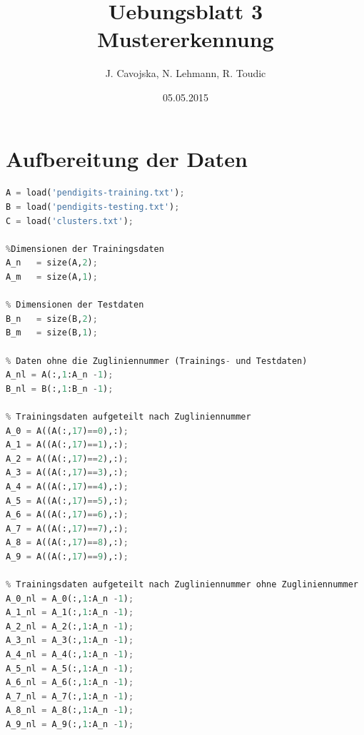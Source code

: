 \documentclass[12pt]{article}
\title{Uebungsblatt 3\\ \glqq Mustererkennung\grqq}
\author{J. Cavojska, N. Lehmann, R. Toudic}
\date{05.05.2015}
\begin{document}
\maketitle

\section{Aufbereitung der Daten}
\begin{lstlisting}[language=Python]
% Trainingsdaten, Testdaten und Clusterdaten laden
A = load('pendigits-training.txt');
B = load('pendigits-testing.txt');
C = load('clusters.txt');

%Dimensionen der Trainingsdaten
A_n   = size(A,2);
A_m   = size(A,1);

% Dimensionen der Testdaten
B_n   = size(B,2);
B_m   = size(B,1);

% Daten ohne die Zugliniennummer (Trainings- und Testdaten)
A_nl = A(:,1:A_n -1);
B_nl = B(:,1:B_n -1);

% Trainingsdaten aufgeteilt nach Zugliniennummer
A_0 = A((A(:,17)==0),:);
A_1 = A((A(:,17)==1),:);
A_2 = A((A(:,17)==2),:);
A_3 = A((A(:,17)==3),:); 
A_4 = A((A(:,17)==4),:);
A_5 = A((A(:,17)==5),:);
A_6 = A((A(:,17)==6),:);
A_7 = A((A(:,17)==7),:);
A_8 = A((A(:,17)==8),:);
A_9 = A((A(:,17)==9),:);

% Trainingsdaten aufgeteilt nach Zugliniennummer ohne Zugliniennummer
A_0_nl = A_0(:,1:A_n -1);
A_1_nl = A_1(:,1:A_n -1);
A_2_nl = A_2(:,1:A_n -1);
A_3_nl = A_3(:,1:A_n -1);
A_4_nl = A_4(:,1:A_n -1);
A_5_nl = A_5(:,1:A_n -1);
A_6_nl = A_6(:,1:A_n -1);
A_7_nl = A_7(:,1:A_n -1);
A_8_nl = A_8(:,1:A_n -1);
A_9_nl = A_9(:,1:A_n -1);
\end{lstlisting}
\end{document}
